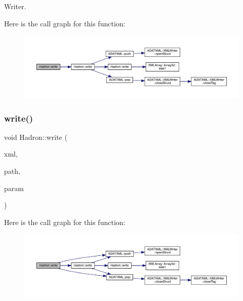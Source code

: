 Writer. 

Here is the call graph for this function\+:
\nopagebreak
\begin{figure}[H]
\begin{center}
\leavevmode
\includegraphics[width=350pt]{d1/daf/namespaceHadron_a7b503b82bc88cdec19d5b7173957b35e_cgraph}
\end{center}
\end{figure}
\mbox{\label{namespaceHadron_a835e4515b6f5e491ce57ac5169196d90}} 
\subsubsection{\texorpdfstring{write()}{write()}\hspace{0.1cm}{\footnotesize\ttfamily [57/95]}}
{\footnotesize\ttfamily void Hadron\+::write (\begin{DoxyParamCaption}\item[{\mbox{\hyperlink{classADATXML_1_1XMLWriter}{X\+M\+L\+Writer}} \&}]{xml,  }\item[{const std\+::string \&}]{path,  }\item[{const \mbox{\hyperlink{structHadron_1_1KeyHadronSUNNPartIrrepOp__t_1_1CGPair__t}{Key\+Hadron\+S\+U\+N\+N\+Part\+Irrep\+Op\+\_\+t\+::\+C\+G\+Pair\+\_\+t}} \&}]{param }\end{DoxyParamCaption})}

Here is the call graph for this function\+:
\nopagebreak
\begin{figure}[H]
\begin{center}
\leavevmode
\includegraphics[width=350pt]{d1/daf/namespaceHadron_a835e4515b6f5e491ce57ac5169196d90_cgraph}
\end{center}
\end{figure}
\mbox{\label{namespaceHadron_ad194604b0eb61ca7e7ffa89d1ef4c879}} 
